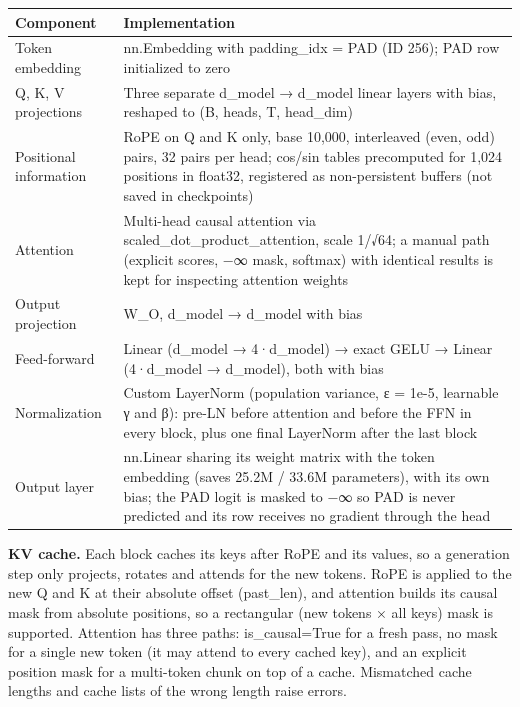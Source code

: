 \documentclass[11pt]{article}
\begin{document}
\begin{center}
\small
\begin{tabularx}{\linewidth}{l>{\raggedright\arraybackslash}X}
\toprule
\textbf{Component} & \textbf{Implementation} \\
\midrule
Token embedding & nn.Embedding with padding\_\allowbreak{}idx = PAD (ID 256); PAD row initialized to zero \\
Q, K, V projections & Three separate d\_\allowbreak{}model → d\_\allowbreak{}model linear layers with bias, reshaped to (B, heads, T, head\_\allowbreak{}dim) \\
Positional information & RoPE on Q and K only, base 10,000, interleaved (even, odd) pairs, 32 pairs per head; cos/\allowbreak{}sin tables precomputed for 1,024 positions in float32, registered as non-persistent buffers (not saved in checkpoints) \\
Attention & Multi-head causal attention via scaled\_\allowbreak{}dot\_\allowbreak{}product\_\allowbreak{}attention, scale 1/\allowbreak{}√64; a manual path (explicit scores, −∞ mask, softmax) with identical results is kept for inspecting attention weights \\
Output projection & W\_\allowbreak{}O, d\_\allowbreak{}model → d\_\allowbreak{}model with bias \\
Feed-forward & Linear (d\_\allowbreak{}model → 4·d\_\allowbreak{}model) → exact GELU → Linear (4·d\_\allowbreak{}model → d\_\allowbreak{}model), both with bias \\
Normalization & Custom LayerNorm (population variance, ε = 1e-5, learnable γ and β): pre-LN before attention and before the FFN in every block, plus one final LayerNorm after the last block \\
Output layer & nn.Linear sharing its weight matrix with the token embedding (saves 25.2M /\allowbreak{} 33.6M parameters), with its own bias; the PAD logit is masked to −∞ so PAD is never predicted and its row receives no gradient through the head \\
\bottomrule
\end{tabularx}
\end{center}

\textbf{KV cache.} Each block caches its keys after RoPE and its values, so a generation step only projects, rotates and attends for the new tokens. RoPE is applied to the new Q and K at their absolute offset (past\_\allowbreak{}len), and attention builds its causal mask from absolute positions, so a rectangular (new tokens × all keys) mask is supported. Attention has three paths: is\_\allowbreak{}causal=True for a fresh pass, no mask for a single new token (it may attend to every cached key), and an explicit position mask for a multi-token chunk on top of a cache. Mismatched cache lengths and cache lists of the wrong length raise errors.
\end{document}
